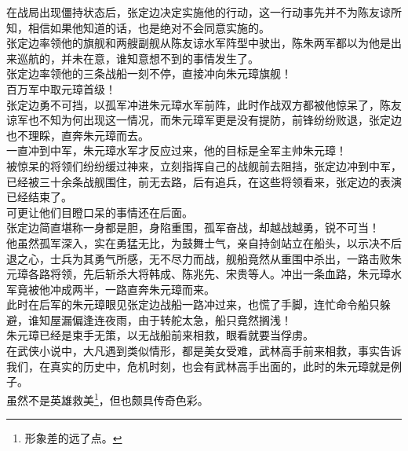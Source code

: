 \begin{multicols}{\theparacolNo}
在战局出现僵持状态后，张定边决定实施他的行动，这一行动事先并不为陈友谅所知，相信如果他知道的话，也是绝对不会同意实施的。\\

张定边率领他的旗舰和两艘副舰从陈友谅水军阵型中驶出，陈朱两军都以为他是出来巡航的，并未在意，谁知意想不到的事情发生了。\\

张定边率领他的三条战船一刻不停，直接冲向朱元璋旗舰！\\

百万军中取元璋首级！\\

张定边勇不可挡，以孤军冲进朱元璋水军前阵，此时作战双方都被他惊呆了，陈友谅军也不知为何出现这一情况，而朱元璋军更是没有提防，前锋纷纷败退，张定边也不理睬，直奔朱元璋而去。\\

一直冲到中军，朱元璋水军才反应过来，他的目标是全军主帅朱元璋！\\

被惊呆的将领们纷纷缓过神来，立刻指挥自己的战舰前去阻挡，张定边冲到中军，已经被三十余条战舰围住，前无去路，后有追兵，在这些将领看来，张定边的表演已经结束了。\\

可更让他们目瞪口呆的事情还在后面。\\

张定边简直堪称一身都是胆，身陷重围，孤军奋战，却越战越勇，锐不可当！\\

他虽然孤军深入，实在勇猛无比，为鼓舞士气，亲自持剑站立在船头，以示决不后退之心，士兵为其勇气所感，无不尽力而战，舰船竟然从重围中杀出，一路击败朱元璋各路将领，先后斩杀大将韩成、陈兆先、宋贵等人。冲出一条血路，朱元璋水军竟被他冲成两半，一路直奔朱元璋而来。\\

此时在后军的朱元璋眼见张定边战船一路冲过来，也慌了手脚，连忙命令船只躲避，谁知屋漏偏逢连夜雨，由于转舵太急，船只竟然搁浅！\\

朱元璋已经是束手无策，以无战船前来相救，眼看就要当俘虏。\\

在武侠小说中，大凡遇到类似情形，都是美女受难，武林高手前来相救，事实告诉我们，在真实的历史中，危机时刻，也会有武林高手出面的，此时的朱元璋就是例子。\\

虽然不是英雄救美\footnote{形象差的远了点。}，但也颇具传奇色彩。\\


\end{multicols}
